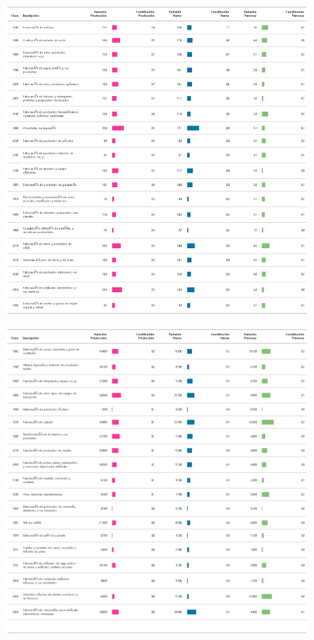 \documentclass[
]{article}
\begin{document}
\begin{center}\includegraphics[width=14.78in]{tabla3_1} \end{center}

\begin{center}\includegraphics[width=14.78in]{tabla3_2} \end{center}
\end{document}
